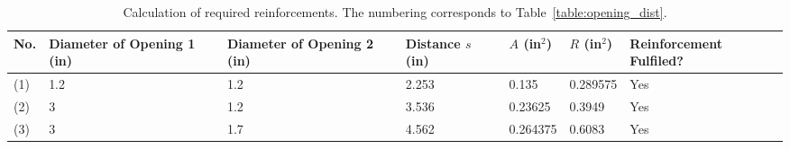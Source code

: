 \begin{table}[h]
\begin{center}
\tabcolsep=10pt
\begin{tabular}{l|m{2cm}|m{2cm}|m{1.4cm}|l|l|m{2.2cm}}
\hline
\hline
No. & Diameter of Opening 1 (in) & 
Diameter of Opening 2 (in) & 
Distance $s$ (in) &
$A$ (in$^2$) & $R$ (in$^2$) & Reinforcement Fulfiled? \\
\hline
(1) & 1.2 & 1.2 & 2.253 & 0.135 & 0.289575 & Yes \\
(2) & 3 & 1.2 & 3.536 & 0.23625 & 0.3949   & Yes \\
(3) & 3 & 1.7 & 4.562 & 0.264375 & 0.6083  & Yes \\
\hline
\hline
\end{tabular}
\caption{Calculation of required reinforcements.  The numbering 
corresponds to Table~\ref{table:opening_dist}. }
\label{table:opening_reinforcement}
\end{center}
\end{table}
